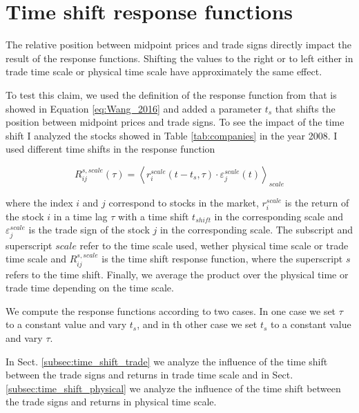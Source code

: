 \section{Time shift response functions}\label{sec:time_shift}

The relative position between midpoint prices and trade signs directly impact
the result of the response functions. Shifting the values to the right or to
left either in trade time scale or physical time scale have approximately the
same effect.

To test this claim, we used the definition of the response function from
\cite{Wang_2016_cross} that is showed in Equation \ref{eq:Wang_2016} and added
a parameter $t_{s}$ that shifts the position between midpoint prices and trade
signs. To see the impact of the time shift I analyzed the stocks showed in
Table \ref{tab:companies} in the year 2008. I used different time shifts in the
response function

\begin{equation}\label{eq:time_shift_general}
    R_{ij}^{s, scale}\left(\tau\right)=\left\langle r^{scale}_{i}
    \left(t-t_{s},\tau\right) \cdot\varepsilon^{scale}_{j}
    \left(t\right)\right\rangle _{scale}
\end{equation}

where the index $i$ and $j$ correspond to stocks in the market, $r^{scale}_{i}$
is the return of the stock $i$ in a time lag $\tau$ with a time shift
$t_{shift}$ in the corresponding scale and $\varepsilon^{scale}_{j}$ is the
trade sign of the stock $j$ in the corresponding scale. The subscript and
superscript $scale$ refer to the time scale used, wether physical time scale or
trade time scale and $R_{ij}^{s,scale}$ is the time shift response function, where the
superscript $s$ refers to the time shift. Finally, we average the product over the physical time or
trade time depending on the time scale.

We compute the response functions according to two cases. In one case we set
$\tau$ to a constant value and vary $t_{s}$, and in th other case we set
$t_{s}$ to a constant value and vary $\tau$.

In Sect. \ref{subsec:time_shift_trade} we analyze the influence of the time
shift between the trade signs and returns in trade time scale and in Sect.
\ref{subsec:time_shift_physical} we analyze the influence of the time shift
between the trade signs and returns in physical time scale.

